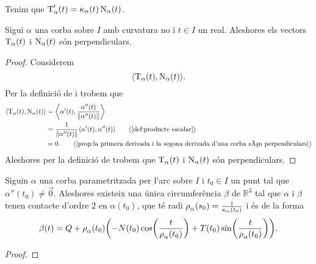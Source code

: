 \documentclass[../Apunts.tex]{subfiles}
\begin{document}
	\begin{observation}
		\label{obs:la derivada de la tangent és la curvatura per la normal}
		Tenim que \(\operatorname{T}_{\alpha}'(t)=\operatorname{\kappa}_{\alpha}(t)\operatorname{N}_{\alpha}(t)\).
	\end{observation}
	\begin{proposition}
		\label{prop:la tangent i la normal d'una corba amb curvatura no nula són perpendiculars}
		Sigui \(\alpha\) una corba sobre \(I\) amb curvatura no \nulla{} i \(t\in I\) un real. Aleshores els vectors \(\operatorname{T}_{\alpha}(t)\) i \(\operatorname{N}_{\alpha}(t)\) són perpendiculars.
		\begin{proof}
			Considerem
			\[\prodesc{\tangent_{\alpha}(t)}{\normal_{\alpha}(t)}.\]
			Per la definició de  i  trobem que
			\begin{align*}
				\prodesc{\tangent_{\alpha}(t)}{\normal_{\alpha}(t)}&=\prodesc[\big]{\alpha'(t)}{\frac{\alpha''(t)}{\norm{\alpha''(t)}}} \\
				&=\frac{1}{\norm{\alpha''(t)}}\prodesc{\alpha'(t)}{\alpha''(t)} \tag{\ref{def:producte escalar}} \\
				&=0. \tag{\ref{prop:la primera derivada i la segona derivada d'una corba són perpendiculars}}
			\end{align*}
			Aleshores per la definició de  trobem que \(\operatorname{T}_{\alpha}(t)\) i \(\operatorname{N}_{\alpha}(t)\) són perpendiculars.
		\end{proof}
	\end{proposition}
	\begin{proposition}
		\label{prop:circumferència osculadora}
		Siguin \(\alpha\) una corba parametritzada per l'arc sobre \(I\) i \(t_{0}\in I\) un punt tal que \(\alpha''(t_{0})\neq\vec{0}\). Aleshores existeix una única circumferència \(\beta\) de \(\mathbb{R}^{3}\) tal que \(\alpha\) i \(\beta\) tenen contacte d'ordre \(2\) en \(\alpha(t_{0})\), que té radi \(\operatorname{\rho}_{\alpha}(s_{0})=\frac{1}{\operatorname{\kappa}_{\alpha}(t_{0})}\) i és de la forma
		\[\beta(t)=Q+\radicircosculadora_{\alpha}(t_{0})\left(-N(t_{0})\cos\left(\frac{t}{\radicircosculadora_{\alpha}(t_{0})}\right)+T(t_{0})\sin\left(\frac{t}{\radicircosculadora_{\alpha}(t_{0})}\right)\right).\]
		\begin{proof}
%			
		\end{proof}
	\end{proposition}
\end{document}
